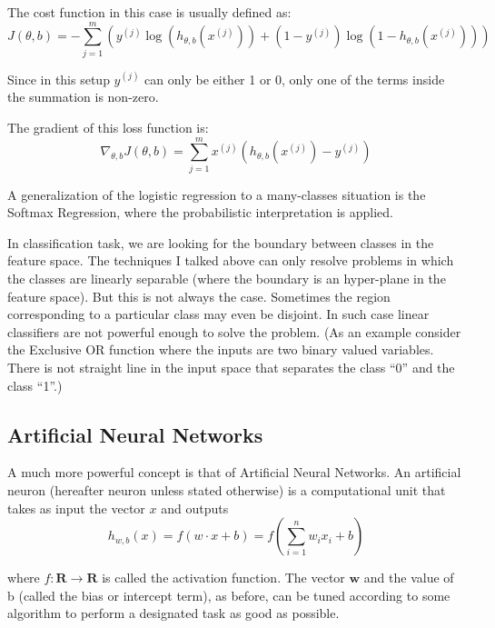 \documentclass{article}
\begin{document}
The cost function in this case is usually defined as:
\begin{equation}
J(\theta,b) = - \sum _{j= 1}^m ( y^{(j)} \log(h_{\theta,b}(x^{(j)})) + (1-y^{(j)}) \log(1- h_{\theta,b}(x^{(j)})) )
\end{equation}

Since in this setup $y^{(j)}$ can only be either 1 or 0, only one of the terms inside the summation is non-zero.

The gradient of this loss function is:
\begin{equation}
\nabla _{\theta,b} J(\theta,b) = \sum _{j= 1}^m x^{(j)} ( h_{\theta,b}(x^{(j)}) - y^{(j)} )
\end{equation}

A generalization of the logistic regression to a many-classes situation is the Softmax Regression, where the probabilistic interpretation is applied.

In classification task, we are looking for the boundary between classes in the feature space. The techniques I talked above can only resolve problems in which the classes are linearly separable (where the boundary is an hyper-plane in the feature space). But this is not always the case. Sometimes the region corresponding to a particular class may even be disjoint. In such case linear classifiers are not powerful enough to solve the problem. (As an example consider the Exclusive OR function where the inputs are two binary valued variables. There is not straight line in the input space that separates the class “0” and the class “1”.)

\subsection{Artificial Neural Networks}
\label{subsec:ANN}

A much more powerful concept is that of Artificial Neural Networks. 
An artificial neuron (hereafter neuron unless stated otherwise) is a computational unit that takes as input the vector $x$ and outputs
\begin{equation}
h_{w,b} (x) = f\left( w \cdot x + b \right) = f \left( \sum_{i=1}^n w_i x_i + b  \right)
\end{equation}

where $f\colon \textbf{R} \rightarrow \textbf{R}$ is called the activation function. The vector $\textbf{w}$ and the value of b (called the bias or intercept term), as before, can be tuned according to some algorithm to perform a designated task as good as possible. 
\end{document}
